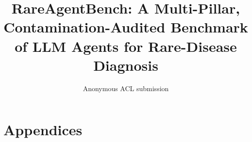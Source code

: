 \documentclass[11pt]{article}
\title{RareAgentBench: A Multi-Pillar, Contamination-Audited Benchmark of LLM Agents for Rare-Disease Diagnosis}
\author{Anonymous ACL submission}
\begin{document}
\maketitle
\raggedbottom


\setcounter{section}{1}











\appendix
\section*{Appendices}









\end{document}
